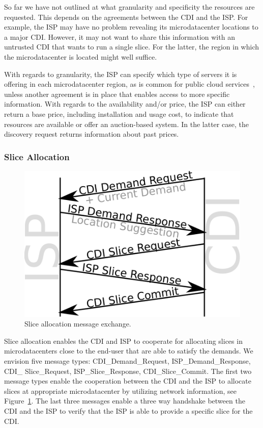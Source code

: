 So far we have not outlined at what granularity and specificity the resources
are requested. This depends on the agreements between the CDI and the ISP.  For
example, the ISP may have no problem revealing its microdatacenter locations to
a major CDI. However, it may not want to share this information with an
untrusted CDI that wants to run a single slice. For the latter, the region in
which the microdatacenter is located might well suffice.

With regards to granularity, the ISP can specify which type of servers it is
offering in each microdatacenter region, as is common for public cloud
services~\cite{amazon}, unless another agreement is in place that enables
access to more specific information.  With regards to the availability and/or
price, the ISP can either return a base price, including installation and usage
cost, to indicate that resources are available or offer an auction-based
system. In the latter case, the discovery request returns information about
past prices.

\subsubsection{Slice Allocation}\label{sec:system-slice-allocation}

\begin{figure}
    \begin{center}
    \includegraphics[width=0.6\linewidth]{figures-pdf/Resource_Negotiation}
    \end{center}
    \vspace*{-1em}
    \caption{Slice allocation message exchange.}
    \label{fig:ResourceAllocation}
\end{figure}

Slice allocation enables the CDI and ISP to cooperate for allocating slices in
microdatacenters close to the end-user that are able to satisfy the demands.
We envision five message types: CDI\_Demand\_Request, ISP\_Demand\_Response,
CDI\_ Slice\_Request, ISP\_Slice\_Response, CDI\_Slice\_Commit. The first two
message types enable the cooperation between the CDI and the ISP to allocate
slices at appropriate microdatacenter by utilizing network information, see
Figure~\ref{fig:ResourceAllocation}. The last three messages enable a three way
handshake between the CDI and the ISP to verify that the ISP is able to provide
a specific slice for the CDI.

